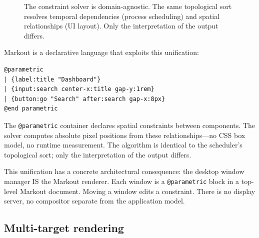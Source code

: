 \documentclass[11pt,a4paper]{article}
\begin{document}
\begin{figure}[h]
\centering
{}
\caption{The constraint solver is domain-agnostic. The same topological sort resolves temporal dependencies (process scheduling) and spatial relationships (UI layout). Only the interpretation of the output differs.}
\label{fig:solver}
\end{figure}

Markout is a declarative language that exploits this unification:

\begin{lstlisting}[language={}]
@parametric
| {label:title "Dashboard"}
| {input:search center-x:title gap-y:1rem}
| {button:go "Search" after:search gap-x:8px}
@end parametric
\end{lstlisting}

The \texttt{@parametric} container declares spatial constraints between components. The solver computes absolute pixel positions from these relationships---no CSS box model, no runtime measurement. The algorithm is identical to the scheduler's topological sort; only the interpretation of the output differs.

This unification has a concrete architectural consequence: the desktop window manager IS the Markout renderer. Each window is a \texttt{@parametric} block in a top-level Markout document. Moving a window edits a constraint. There is no display server, no compositor separate from the application model.

\subsection{Multi-target rendering}
\end{document}
